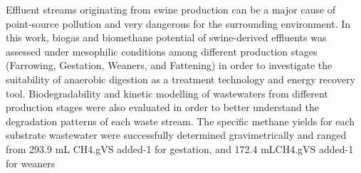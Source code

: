 Effluent streams originating from swine production can be a major cause of point-source pollution and very dangerous for the surrounding environment. In this work, biogas and biomethane potential of swine-derived effluents was assessed under mesophilic conditions among different production stages (Farrowing, Gestation, Weaners, and Fattening) in order to investigate the suitability of anaerobic digestion as a treatment technology and energy recovery tool. Biodegradability and kinetic modelling of wastewaters from different production stages were also evaluated in order to better understand the degradation patterns of each waste stream. The specific methane yields for each substrate wastewater were successfully determined gravimetrically and ranged from 293.9 mL CH4.gVS added-1 for gestation,  and 172.4 mLCH4.gVS added-1 for weaners